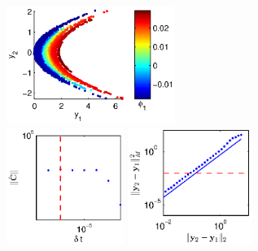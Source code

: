 \def \figheight {1.5in}

\begin{figure}[t]

\begin{subfigure}{\textwidth}
\includegraphics[height=\figheight]{data_nonlinear_NIV_dt1_kernel1}
\hfill
\includegraphics[height=\figheight]{C_dt_nonlinear_dt1_kernel1}
\hfill
\includegraphics[height=\figheight]{dist_dy_nonlinear_dt1_kernel1}
\end{subfigure}


\end{figure}
